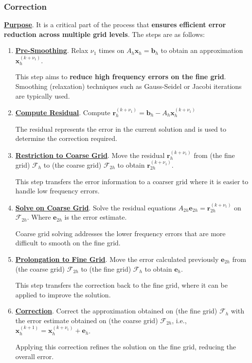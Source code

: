 \subsubsection{Correction}\label{subsubsection: Correction}

\textbf{\underline{Purpose}}. It is a critical part of the process that \textbf{ensures efficient error reduction across multiple grid levels}. The steps are as follows:
\begin{enumerate}
    \item \textbf{\underline{Pre-Smoothing}}. Relax $\nu_{1}$ times on $A_{h}\mathbf{x}_{h} = \mathbf{b}_{h}$ to obtain an approximation $\mathbf{x}_{h}^{\left(k+\nu_{1}\right)}$.
    
    This step aims to \textbf{reduce high frequency errors on the fine grid}. Smoothing (relaxation) techniques such as Gauss-Seidel or Jacobi iterations are typically used.
    
    \item \textbf{\underline{Compute Residual}}. Compute $\mathbf{r}_{h}^{\left(k+\nu_{1}\right)} = \mathbf{b}_{h} - A_{h}\mathbf{x}_{h}^{\left(k+\nu_{1}\right)}$
    
    The residual represents the error in the current solution and is used to determine the correction required.

    \item \textbf{\underline{Restriction to Coarse Grid}}. Move the residual $\mathbf{r}_{h}^{\left(k+\nu_{1}\right)}$ from (the fine grid) $\mathcal{F}_{h}$ to (the coarse grid) $\mathcal{F}_{2h}$ to obtain $\mathbf{r}_{2h}^{\left(k+\nu_{1}\right)}$.

    This step transfers the error information to a coarser grid where it is easier to handle low frequency errors.

    \item \textbf{\underline{Solve on Coarse Grid}}. Solve the residual equations $A_{2h}\mathbf{e}_{2h} = \mathbf{r}_{2h}^{\left(k+\nu_{1}\right)}$ on $\mathcal{F}_{2h}$. Where $\mathbf{e}_{2h}$ is the error estimate.

    Coarse grid solving addresses the lower frequency errors that are more difficult to smooth on the fine grid.

    \item \textbf{\underline{Prolongation to Fine Grid}}. Move the error calculated previously $\mathbf{e}_{2h}$ from (the coarse grid) $\mathcal{F}_{2h}$ to (the fine grid) $\mathcal{F}_{h}$ to obtain $\mathbf{e}_{h}$.

    This step transfers the correction back to the fine grid, where it can be applied to improve the solution.

    \item \textbf{\underline{Correction}}. Correct the approximation obtained on (the fine grid) $\mathcal{F}_{h}$ with the error estimate obtained on (the coarse grid) $\mathcal{F}_{2h}$, i.e., $\mathbf{x}_{h}^{\left(k+1\right)} = \mathbf{x}_{h}^{\left(k+\nu_{1}\right)} + \mathbf{e}_{h}$.

    Applying this correction refines the solution on the fine grid, reducing the overall error.
\end{enumerate}
